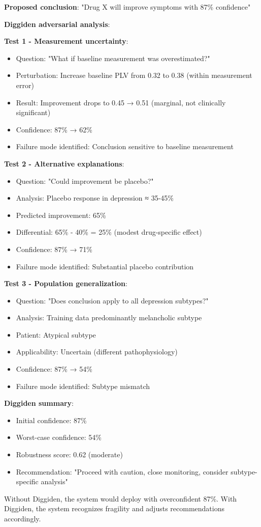 \begin{example}
\textbf{Proposed conclusion}: "Drug X will improve symptoms with 87\% confidence"

\textbf{Diggiden adversarial analysis}:

\textbf{Test 1 - Measurement uncertainty}:
\begin{itemize}
\item Question: "What if baseline measurement was overestimated?"
\item Perturbation: Increase baseline PLV from 0.32 to 0.38 (within measurement error)
\item Result: Improvement drops to 0.45 → 0.51 (marginal, not clinically significant)
\item Confidence: 87\% → 62\%
\item Failure mode identified: Conclusion sensitive to baseline measurement
\end{itemize}

\textbf{Test 2 - Alternative explanations}:
\begin{itemize}
\item Question: "Could improvement be placebo?"
\item Analysis: Placebo response in depression ≈ 35-45\%
\item Predicted improvement: 65\%
\item Differential: 65\% - 40\% = 25\% (modest drug-specific effect)
\item Confidence: 87\% → 71\%
\item Failure mode identified: Substantial placebo contribution
\end{itemize}

\textbf{Test 3 - Population generalization}:
\begin{itemize}
\item Question: "Does conclusion apply to all depression subtypes?"
\item Analysis: Training data predominantly melancholic subtype
\item Patient: Atypical subtype
\item Applicability: Uncertain (different pathophysiology)
\item Confidence: 87\% → 54\%
\item Failure mode identified: Subtype mismatch
\end{itemize}

\textbf{Diggiden summary}:
\begin{itemize}
\item Initial confidence: 87\%
\item Worst-case confidence: 54\%
\item Robustness score: 0.62 (moderate)
\item Recommendation: "Proceed with caution, close monitoring, consider subtype-specific analysis"
\end{itemize}

Without Diggiden, the system would deploy with overconfident 87\%. With Diggiden, the system recognizes fragility and adjusts recommendations accordingly.
\end{example}

